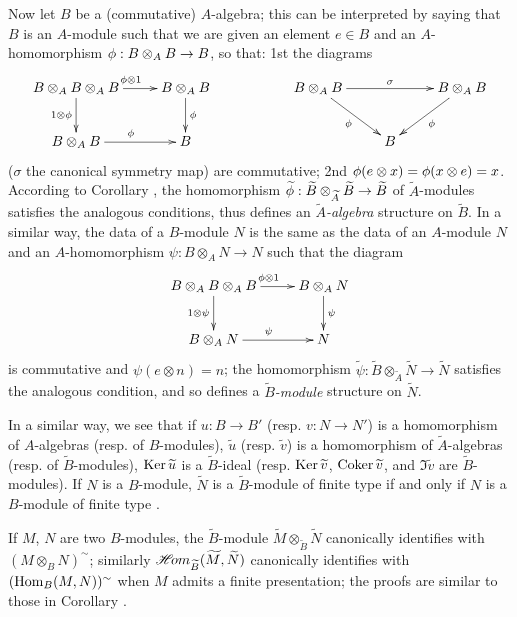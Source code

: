 \begin{env}[1.3.13]
\label{1.1.3.13}
Now let $B$ be a (commutative) $A$-algebra; this can be interpreted by saying that $B$ is an
$A$-module such that we are given an element $e\in B$ and an $A$-homomorphism
$\phi:B\otimes_A B\to B$, so that: 1st the diagrams
\[
  \xymatrix{
    B\otimes_A B\otimes_A B\ar[r]^{\vphi\otimes 1}\ar[d]_{1\otimes\vphi} &
    B\otimes_A B\ar[d]^\vphi & &
    B\otimes_A B\ar[rr]^\sigma\ar[rd]_\vphi & &
    B\otimes_A B\ar[dl]^\vphi\\
    B\otimes_A B\ar[r]^\vphi &
    B & & &
    B
  }
\]
($\sigma$ the canonical symmetry map) are commutative; 2nd
$\phi(e\otimes x)=\phi(x\otimes e)=x$. According to
Corollary , the homomorphism
$\widetilde{\phi}:\widetilde{B}\otimes_{\widetilde{A}}\widetilde{B}\to\widetilde{B}$ of
$\widetilde{A}$-modules satisfies the analogous conditions, thus defines an
{\em $\widetilde{A}$-algebra} structure on $\widetilde{B}$. In a similar way, the data of
a $B$-module $N$ is the same as the data of an $A$-module $N$ and an $A$-homomorphism
$\psi:B\otimes_A N\to N$ such that the diagram
\[
  \xymatrix{
    B\otimes_A B\otimes_A B\ar[r]^{\vphi\otimes 1}\ar[d]_{1\otimes\psi} &
    B\otimes_A N\ar[d]^\psi\\
    B\otimes_A N\ar[r]^\psi &
    N
  }
\]
is commutative and $\psi(e\otimes n)=n$; the homomorphism
$\widetilde{\psi}:\widetilde{B}\otimes_{\widetilde{A}}\widetilde{N}\to\widetilde{N}$
satisfies the analogous condition, and so defines a {\em $\widetilde{B}$-module} structure
on $\widetilde{N}$.

In a similar way, we see that if $u:B\to B'$ (resp. $v:N\to N'$) is a homomorphism of
$A$-algebras (resp. of $B$-modules), $\widetilde{u}$ (resp. $\widetilde{v}$) is a
homomorphism of $\widetilde{A}$-algebras (resp. of $\widetilde{B}$-modules),
${\mathop{\mathrm{Ker}}\nolimits}\,\widetilde{u}$ is a $\widetilde{B}$-ideal (resp. ${\mathop{\mathrm{Ker}}\nolimits}\,\widetilde{v}$,
${\mathop{\mathrm{Coker}}\nolimits}\,\widetilde{v}$, and $\Im\widetilde{v}$ are $\widetilde{B}$-modules). If $N$ is a
$B$-module, $\widetilde{N}$ is a $\widetilde{B}$-module of finite type if and only if $N$
is a $B$-module of finite type .

If $M$, $N$ are two $B$-modules, the $\widetilde{B}$-module
$\widetilde{M}\otimes_{\widetilde{B}}\widetilde{N}$ canonically identifies with
$(M\otimes_B N)^\sim$; similarly $\mathscr{H}\!{om}_{\widetilde{B}}(\widetilde{M},\widetilde{N})$
canonically identifies with $({\mathop{\mathrm{Hom}}\nolimits}_B(M,N))^\sim$ when $M$ admits a finite presentation; the
proofs are similar to those in Corollary .


\end{env}
